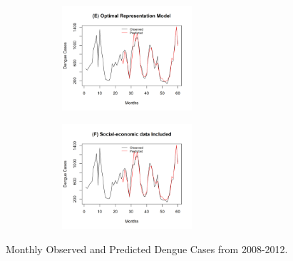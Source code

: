 \documentclass{bmcart}
\begin{document}
\begin{figure}[htbp]
\begin{minipage}[c]{1.0\textwidth}
		\label{fig:test3} \par\vfill
		\includegraphics[width=9cm,height=3.9cm]{Pred-OptimalRepresentation}
		\label{fig:test4} \par\vfill
		\includegraphics[width=9cm,height=3.9cm]{Pred-SocialIncluded}
		\label{fig:test5}
	\end{minipage}
	\caption{Monthly Observed and Predicted Dengue Cases from 2008-2012.}
	\label{fig:lolo}
\end{figure}



\end{document}
